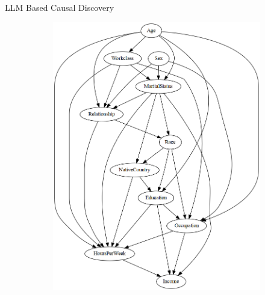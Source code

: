 \documentclass{beamer}
\begin{document}
\begin{frame}{LLM Based Causal Discovery}
\begin{figure}
\begin{subfigure}{0.45 \textwidth}
			\includegraphics[scale=0.23]{imgs/adult_llm.png}
		\end{subfigure}
	\end{figure}

\end{frame}

% 
\end{document}
